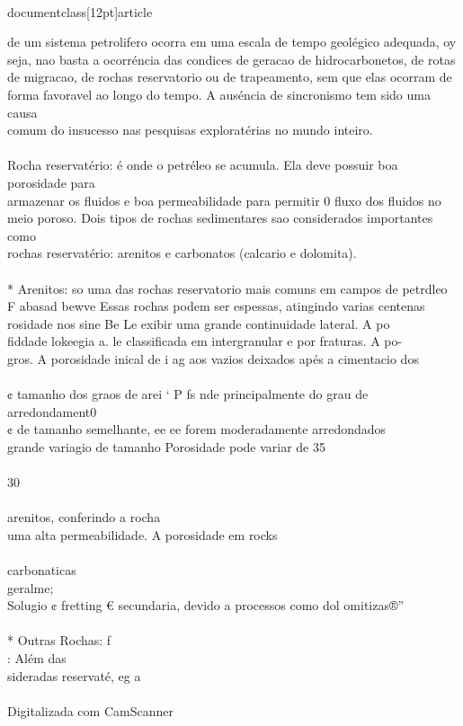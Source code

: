 \\documentclass[12pt]{article}
\begin{document}
{de um sistema petrolifero ocorra em uma escala de tempo geolégico adequada, oy\\
seja, nao basta a ocorréncia das condices de geracao de hidrocarbonetos, de rotas\\
de migracao, de rochas reservatorio ou de trapeamento, sem que elas ocorram de\\
forma favoravel ao longo do tempo. A auséncia de sincronismo tem sido uma causa\\
comum do insucesso nas pesquisas exploratérias no mundo inteiro.\\
\\
Rocha reservatério: é onde o petréleo se acumula. Ela deve possuir boa porosidade para\\
armazenar os fluidos e boa permeabilidade para permitir 0 fluxo dos fluidos no\\
meio poroso. Dois tipos de rochas sedimentares sao considerados importantes como\\
rochas reservatério: arenitos e carbonatos (calcario e dolomita).\\
\\
* Arenitos: so uma das rochas reservatorio mais comuns em campos de petrdleo\\
F abasad bewve Essas rochas podem ser espessas, atingindo varias centenas\\
rosidade nos sine Be Le exibir uma grande continuidade lateral. A po\\
fiddade lokeegia a. le classificada em intergranular e por fraturas. A po-\\
gros. A porosidade inical de i ag aos vazios deixados apés a cimentacio dos\\
\\
¢ tamanho dos graos de arei ‘ P fs nde principalmente do grau de arredondament0\\
¢ de tamanho semelhante, ee ee forem moderadamente arredondados\\
grande variagio de tamanho Porosidade pode variar de 35\\%
\\
30\\%
\\
arenitos, conferindo a rocha\\
uma alta permeabilidade. A porosidade em rocks\\
\\
carbonaticas\\
geralme;\\
Solugio ¢ fretting € secundaria, devido a processos como dol omitizas®”\\
\\
* Outras Rochas: f\\
: Além das\\
sideradas reservaté, eg a\\
\\
Digitalizada com CamScanner\\

}
\end{document}
